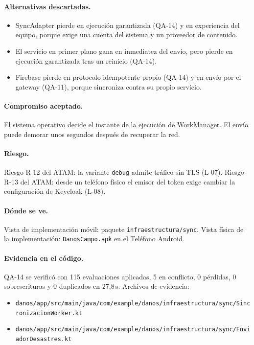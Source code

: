 \paragraph{Alternativas descartadas.}
\begin{itemize}
  \item SyncAdapter pierde en ejecución garantizada (QA-14) y en experiencia del equipo, porque exige una cuenta del sistema y un proveedor de contenido.
  \item El servicio en primer plano gana en inmediatez del envío, pero pierde en ejecución garantizada tras un reinicio (QA-14).
  \item Firebase pierde en protocolo idempotente propio (QA-14) y en envío por el gateway (QA-11), porque sincroniza contra su propio servicio.
\end{itemize}

\paragraph{Compromiso aceptado.} El sistema operativo decide el instante de la ejecución de WorkManager.
El envío puede demorar unos segundos después de recuperar la red.

\paragraph{Riesgo.} Riesgo R-12 del ATAM: la variante \texttt{debug} admite tráfico sin TLS (L-07).
Riesgo R-13 del ATAM: desde un teléfono físico el emisor del token exige cambiar la configuración de Keycloak (L-08).

\paragraph{Dónde se ve.} Vista de implementación móvil: paquete \texttt{infraestructura/sync}.
Vista física de la implementación: \texttt{DanosCampo.apk} en el Teléfono Android.

\paragraph{Evidencia en el código.} QA-14 se verificó con 115 evaluaciones aplicadas, 5 en conflicto, 0 pérdidas, 0 sobrescrituras y 0 duplicados en 27,8\,s.
Archivos de evidencia:
{\raggedright
\begin{itemize}
  \item \texttt{danos/\br{}app/\br{}src/\br{}main/\br{}java/\br{}com/\br{}example/\br{}danos/\br{}infraestructura/\br{}sync/\br{}SincronizacionWorker.kt}
  \item \texttt{danos/\br{}app/\br{}src/\br{}main/\br{}java/\br{}com/\br{}example/\br{}danos/\br{}infraestructura/\br{}sync/\br{}EnviadorDesastres.kt}
\end{itemize}
\par}

